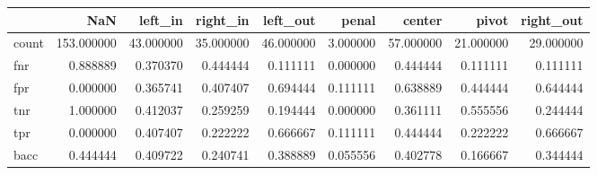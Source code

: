\begin{tabular}{lrrrrrrrr}
\toprule
{} &         NaN &    left\_in &   right\_in &   left\_out &     penal &     center &      pivot &  right\_out \\
\midrule
count &  153.000000 &  43.000000 &  35.000000 &  46.000000 &  3.000000 &  57.000000 &  21.000000 &  29.000000 \\
fnr   &    0.888889 &   0.370370 &   0.444444 &   0.111111 &  0.000000 &   0.444444 &   0.111111 &   0.111111 \\
fpr   &    0.000000 &   0.365741 &   0.407407 &   0.694444 &  0.111111 &   0.638889 &   0.444444 &   0.644444 \\
tnr   &    1.000000 &   0.412037 &   0.259259 &   0.194444 &  0.000000 &   0.361111 &   0.555556 &   0.244444 \\
tpr   &    0.000000 &   0.407407 &   0.222222 &   0.666667 &  0.111111 &   0.444444 &   0.222222 &   0.666667 \\
bacc  &    0.444444 &   0.409722 &   0.240741 &   0.388889 &  0.055556 &   0.402778 &   0.166667 &   0.344444 \\
\bottomrule
\end{tabular}
